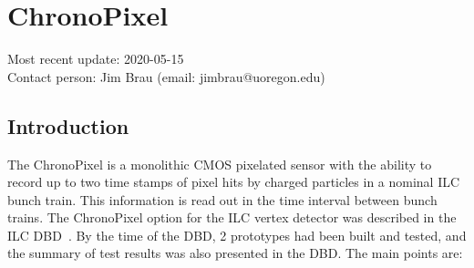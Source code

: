 \section{ChronoPixel}
Most recent update: 2020-05-15 \\
Contact person: Jim Brau (email: jimbrau@uoregon.edu)
\subsection{Introduction}
The ChronoPixel is a monolithic CMOS pixelated sensor with the ability to record up to two time stamps of pixel hits by charged particles in a nominal ILC bunch train. This information is read out in the time interval between bunch trains. The ChronoPixel option for the ILC vertex detector was described in the ILC DBD~\cite{2011arXiv1109.2811B}. By the time of the DBD, 2 prototypes had been built and tested, and the summary of test results was also presented in the DBD. The main points are:

